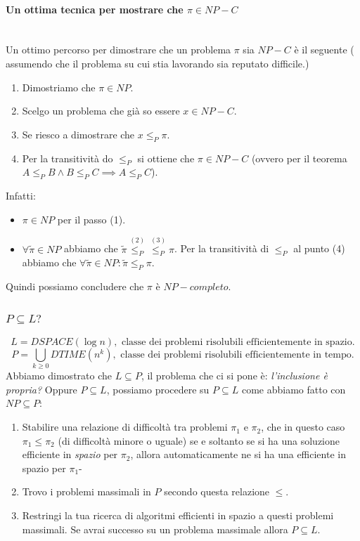 \documentclass{article}
\begin{document}
\paragraph{Un ottima tecnica per mostrare che $\pi\in NP-C$}\mbox{}\\
Un ottimo percorso per dimostrare che un problema $\pi$ sia $NP-C$ è il seguente (
    assumendo che il problema su cui stia lavorando sia reputato difficile.)
\begin{enumerate}
    \item Dimostriamo che $\pi\in NP$.
    \item Scelgo un problema che già so essere $x\in NP-C$.
    \item Se riesco a dimostrare che $x\leq_P \pi$.
    \item Per la transitività do $\leq_P$ si ottiene che $\pi\in NP-C$ (ovvero
    per il teorema $A\leq_P B\land B\leq_P C\implies A\leq_P C$).
\end{enumerate}
Infatti:
\begin{itemize}
    \item $\pi\in NP$ per il passo (1).
    \item $\forall\tilde{\pi}\in NP$ abbiamo che
    $\tilde{\pi}\overset{(2)}{\leq_P}\overset{(3)}{\leq_P}\pi$. Per la transitività
    di $\leq_P$ al punto (4) abbiamo che $\forall\tilde{\pi}\in NP:\tilde{\pi}\leq_P\pi$.
\end{itemize}
Quindi possiamo concludere che $\pi$ è $NP-completo$.

\subsubsection{$P\subseteq L?$}
$$L=DSPACE(\log n),\text{ classe dei problemi risolubili efficientemente in spazio.}$$
$$P=\bigcup_{k\geq 0}DTIME(n^k),\text{ classe dei problemi risolubili efficientemente in tempo.}$$
Abbiamo dimostrato che $L\subseteq P$, il problema che ci si pone è:\textit{ l'inclusione
è propria?} Oppure $P\subseteq L$, possiamo procedere su $P\subseteq L$ come abbiamo
fatto con $NP\subseteq P$:
\begin{enumerate}
    \item Stabilire una relazione di difficoltà tra problemi $\pi_1$ e $\pi_2$, che in questo
    caso $\pi_1\leq\pi_2$ (di difficoltà minore o uguale) se e soltanto se si ha una
    soluzione efficiente in \textit{spazio} per $\pi_2$, allora automaticamente ne si ha
    una efficiente in spazio per $\pi_1$-

    \item Trovo i problemi massimali in $P$ secondo questa relazione $\leq$.

    \item Restringi la tua ricerca di algoritmi efficienti in spazio a questi problemi
    massimali. Se avrai successo su un problema massimale allora $P\subseteq L$.
\end{enumerate}
\end{document}
